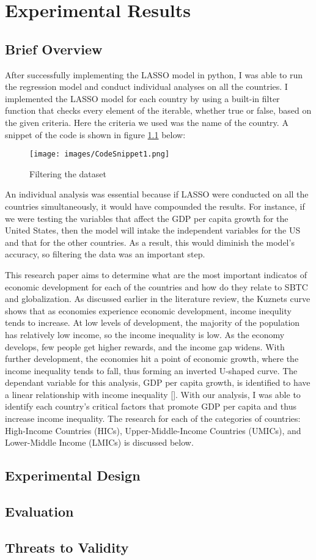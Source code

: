 \chapter{Experimental Results} 
\label{ch:experiments}

\section{Brief Overview}
After successfully implementing the LASSO model in python, I was able to run the regression model and conduct individual analyses on all the countries. I implemented the LASSO model for each country by using a built-in filter function that checks every element of the iterable, whether true or false, based on the given criteria. Here the criteria we used was the name of the country. A snippet of the code is shown in figure \ref{fig1} below:
\begin{figure}[ht]
\centering
\texttt{[image: images/CodeSnippet1.png]}
\caption{
        Filtering the dataset
    }
\label{fig1}
\end{figure}

 
An individual analysis was essential because if LASSO were conducted on all the countries simultaneously, it would have compounded the results. For instance, if we were testing the variables that affect the GDP per capita growth for the United States, then the model will intake the independent variables for the US and that for the other countries. As a result, this would diminish the model’s accuracy, so filtering the data was an important step.

This research paper aims to determine what are the most important indicatos of economic development for each of the countries and how do they relate to SBTC and globalization. As discussed earlier in the literature review, the Kuznets curve shows that as economies experience economic development, income inequlity tends to increase. At low levels of development, the majority of the population has relatively low income, so the income inequality is low. As the economy develops, few people get higher rewards, and the income gap widens. With further development, the economies hit a point of economic growth, where the income inequality tends to fall, thus forming an inverted U-shaped curve. The dependant variable for this analysis, GDP per capita growth, is identified to have a linear relationship with income inequality []. With our analysis, I was able to identify each country’s critical factors that promote GDP per capita and thus increase income inequality. The research for each of the categories of countries: High-Income Countries (HICs), Upper-Middle-Income Countries (UMICs), and Lower-Middle Income (LMICs) is discussed below.

\section{Experimental Design}

\section{Evaluation}

\section{Threats to Validity}
